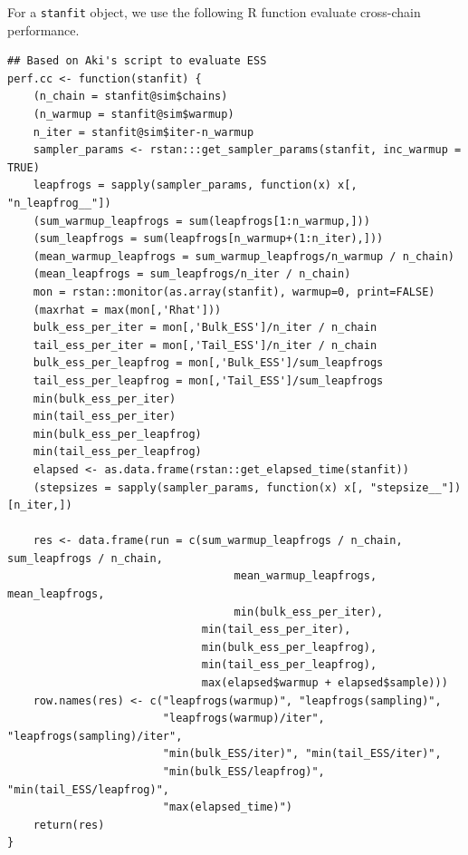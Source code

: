 \documentclass[11pt, reqno, oneside]{amsart}
\begin{document}
For a \texttt{stanfit} object, we use the following R
function evaluate cross-chain performance.
\begin{verbatim}
## Based on Aki's script to evaluate ESS
perf.cc <- function(stanfit) {
    (n_chain = stanfit@sim$chains)
    (n_warmup = stanfit@sim$warmup)
    n_iter = stanfit@sim$iter-n_warmup
    sampler_params <- rstan:::get_sampler_params(stanfit, inc_warmup = TRUE)
    leapfrogs = sapply(sampler_params, function(x) x[, "n_leapfrog__"])
    (sum_warmup_leapfrogs = sum(leapfrogs[1:n_warmup,]))
    (sum_leapfrogs = sum(leapfrogs[n_warmup+(1:n_iter),]))
    (mean_warmup_leapfrogs = sum_warmup_leapfrogs/n_warmup / n_chain)
    (mean_leapfrogs = sum_leapfrogs/n_iter / n_chain)
    mon = rstan::monitor(as.array(stanfit), warmup=0, print=FALSE)
    (maxrhat = max(mon[,'Rhat']))
    bulk_ess_per_iter = mon[,'Bulk_ESS']/n_iter / n_chain
    tail_ess_per_iter = mon[,'Tail_ESS']/n_iter / n_chain
    bulk_ess_per_leapfrog = mon[,'Bulk_ESS']/sum_leapfrogs
    tail_ess_per_leapfrog = mon[,'Tail_ESS']/sum_leapfrogs
    min(bulk_ess_per_iter)
    min(tail_ess_per_iter)
    min(bulk_ess_per_leapfrog)
    min(tail_ess_per_leapfrog)
    elapsed <- as.data.frame(rstan::get_elapsed_time(stanfit))
    (stepsizes = sapply(sampler_params, function(x) x[, "stepsize__"])[n_iter,])

    res <- data.frame(run = c(sum_warmup_leapfrogs / n_chain, sum_leapfrogs / n_chain,
                                   mean_warmup_leapfrogs, mean_leapfrogs,
                                   min(bulk_ess_per_iter),
                              min(tail_ess_per_iter),
                              min(bulk_ess_per_leapfrog),
                              min(tail_ess_per_leapfrog),
                              max(elapsed$warmup + elapsed$sample)))
    row.names(res) <- c("leapfrogs(warmup)", "leapfrogs(sampling)",
                        "leapfrogs(warmup)/iter", "leapfrogs(sampling)/iter",
                        "min(bulk_ESS/iter)", "min(tail_ESS/iter)",
                        "min(bulk_ESS/leapfrog)", "min(tail_ESS/leapfrog)",
                        "max(elapsed_time)")
    return(res)
}
\end{verbatim}
\end{document}
